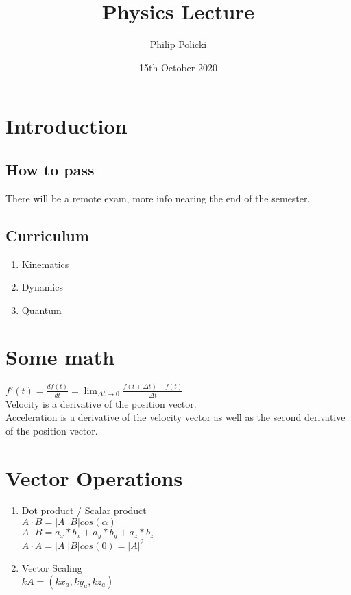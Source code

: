 \documentclass{article}
\title{Physics Lecture }
\author{Philip Policki}
\date{15th October 2020}
\begin{document}
\maketitle

\section{Introduction}
\subsection{How to pass}
There will be a remote exam, more info nearing the end of the semester.
\subsection{Curriculum}
\begin{enumerate}
	\item Kinematics
	\item Dynamics
	\item Quantum
\end{enumerate}

\section{Some math}
$ f'(t) = \frac{df(t)}{dt} = \lim_{\Delta t\to 0} \frac{f(t+\Delta t) - f(t)}{\Delta t}$ \\
Velocity is a derivative of the position vector. \\
Acceleration is a derivative of the velocity vector as well as the second derivative of the position vector. \\

\section{Vector Operations}
\begin{enumerate}
	\item Dot product / Scalar product \\
	$ A \cdot B = |A||B|cos(\alpha)$ \\
	$ A \cdot B = a_x * b_x + a_y * b_y + a_z * b_z$ \\ 
	$ A \cdot A = |A||B|cos(0) = |A|^2$
	\item Vector Scaling \\
	$ kA = (kx_a, ky_a, kz_a)$
\end{enumerate}
\end{document}
